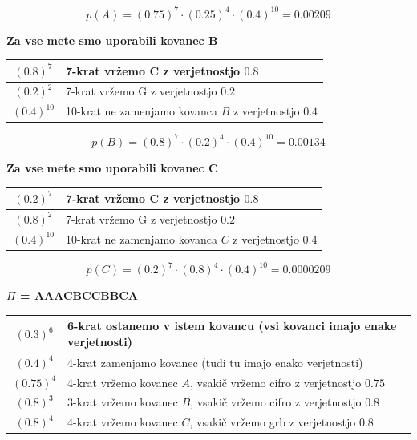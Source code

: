 \documentclass{article}
\begin{document}
\begin{enumerate}
\begin{center}
				$$
				p(A) = (0.75)^7 \cdot (0.25)^4 \cdot (0.4)^{10} = 0.00209
				$$
			\end{center}

			\textbf{Za vse mete smo uporabili kovanec B}

			\begin{center}
				\begin{tabular}{c||l}
					$(0.8)^7$ & 7-krat vržemo C z verjetnostjo $0.8$ \\
					\hline
					$(0.2)^2$ & 7-krat vržemo G z verjetnostjo $0.2$ \\
					\hline
					$(0.4)^{10}$ & 10-krat ne zamenjamo kovanca $B$ z verjetnostjo $0.4$
				\end{tabular}

				$$
				p(B) = (0.8)^7 \cdot (0.2)^4 \cdot (0.4)^{10} = 0.00134
				$$
			\end{center}

			\textbf{Za vse mete smo uporabili kovanec C}

			\begin{center}
				\begin{tabular}{c||l}
					$(0.2)^7$ & 7-krat vržemo C z verjetnostjo $0.8$ \\
					\hline
					$(0.8)^2$ & 7-krat vržemo G z verjetnostjo $0.2$ \\
					\hline
					$(0.4)^{10}$ & 10-krat ne zamenjamo kovanca $C$ z verjetnostjo $0.4$
				\end{tabular}

				$$
				p(C) = (0.2)^7 \cdot (0.8)^4 \cdot (0.4)^{10} = 0.0000209
				$$
			\end{center}

			\textbf{$\Pi$ = AAACBCCBBCA}

			\begin{center}
				\begin{tabular}{c||l}
					$(0.3)^6$ & 6-krat ostanemo v istem kovancu (vsi kovanci imajo enake verjetnosti) \\
					\hline
					$(0.4)^4$ & 4-krat zamenjamo kovanec (tudi tu imajo enako verjetnosti) \\
					\hline
					$(0.75)^4$ & 4-krat vržemo kovanec $A$, vsakič vržemo cifro z verjetnostjo $0.75$ \\
					\hline
					$(0.8)^3$ & 3-krat vržemo kovanec $B$, vsakič vržemo cifro z verjetnostjo $0.8$ \\
					\hline
					$(0.8)^4$ & 4-krat vržemo kovanec $C$, vsakič vržemo grb z verjetnostjo $0.8$
				\end{tabular}


\end{center}
\end{enumerate}
\end{document}
